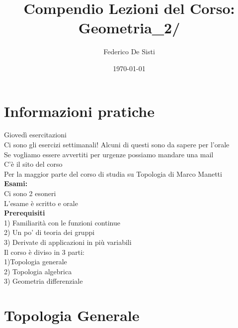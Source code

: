 \documentclass{article}
\title{Compendio Lezioni del Corso: Geometria_2/}
\date{\today}
\author{Federico De Sisti}
\begin{document}
\maketitle
\maketitle
	\newpage
	\section{Informazioni pratiche}
	Giovedì esercitazioni\\
	Ci sono gli esercizi settimanali! Alcuni di questi sono da sapere per l'orale\\
	Se vogliamo essere avvertiti per urgenze possiamo mandare una mail\\
	C'è il sito del corso\\
	Per la maggior parte del corso di studia su Topologia di Marco Manetti\\
	\textbf{Esami:}\\
	Ci sono 2 esoneri\\
	L'esame è scritto e orale\\
	\textbf{Prerequisiti}\\
	1) Familiarità con le funzioni continue\\
	2) Un po' di teoria dei gruppi\\
	3) Derivate di applicazioni in più variabili\\[10px]
	Il corso è diviso in 3 parti:\\
	1)Topologia generale\\
	2) Topologia algebrica\\
	3) Geometria differenziale\\
	\section{Topologia Generale}
\end{document}
